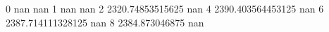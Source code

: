 0 nan nan
1 nan nan
2 2320.74853515625 nan
4 2390.403564453125 nan
6 2387.714111328125 nan
8 2384.873046875 nan
